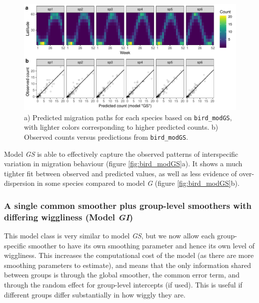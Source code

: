 \documentclass[12pt]{article}
\begin{document}
\begin{figure}
\includegraphics[width=\linewidth]{../figures/bird_modGS_ggplot-1} \caption{\label{fig:bird_modGS}a) Predicted migration paths for each species based on \texttt{bird\_modGS}, with lighter colors corresponding to higher predicted counts. b) Observed counts versus predictions from \texttt{bird\_modGS}.}\label{fig:bird_modGS_ggplot}
\end{figure}

Model \emph{GS} is able to effectively capture the observed patterns of
interspecific variation in migration behaviour (figure
\ref{fig:bird_modGS}a). It shows a much tighter fit between observed and
predicted values, as well as less evidence of over-dispersion in some
species compared to model \emph{G} (figure \ref{fig:bird_modGS}b).

\subsubsection{\texorpdfstring{A single common smoother plus group-level
smoothers with differing wiggliness (Model
\emph{GI})}{A single common smoother plus group-level smoothers with differing wiggliness (Model GI)}}\label{a-single-common-smoother-plus-group-level-smoothers-with-differing-wiggliness-model-gi}

This model class is very similar to model \emph{GS}, but we now allow
each group-specific smoother to have its own smoothing parameter and
hence its own level of wiggliness. This increases the computational cost
of the model (as there are more smoothing parameters to estimate), and
means that the only information shared between groups is through the
global smoother, the common error term, and through the random effect
for group-level intercepts (if used). This is useful if different groups
differ substantially in how wiggly they are.
\end{document}
